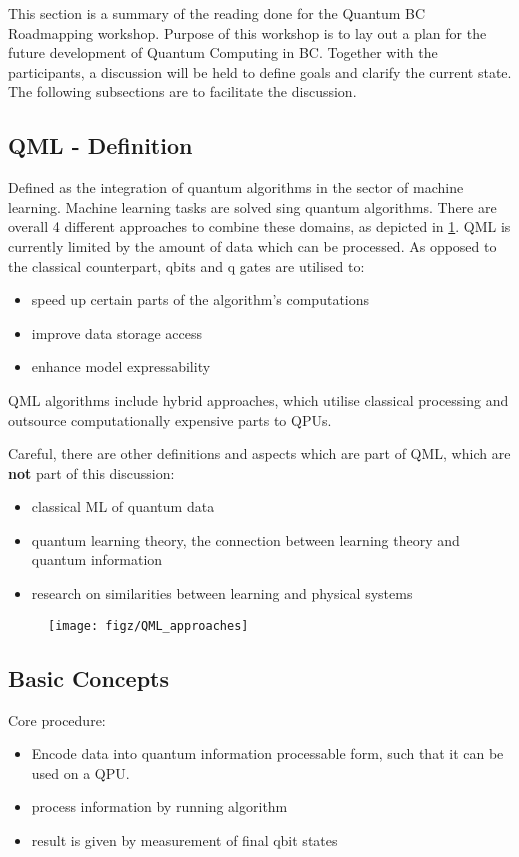 This section is a summary of the reading done for the Quantum BC Roadmapping
workshop. Purpose of this workshop is to lay out a plan for the future
development of Quantum Computing in BC. Together with the participants, a
discussion will be held to define goals and clarify the current state. The
following subsections are to facilitate the discussion.

\subsection{QML - Definition}
Defined as the integration of quantum algorithms in the sector of machine
learning. Machine learning tasks are solved sing quantum algorithms. There are
overall 4 different approaches to combine these domains, as depicted in
\ref{fig:algvsdata}. QML is currently limited by the amount of data which can be
processed. As opposed to the classical counterpart, qbits and q gates are
utilised to:
\begin{itemize}
    \item speed up certain parts of the algorithm's computations
    \item improve data storage access
    \item enhance model expressability
\end{itemize}
QML algorithms include hybrid approaches, which utilise classical processing and
outsource computationally expensive parts to QPUs. 

Careful, there are other definitions and aspects which are part of QML, which
are \textbf{not} part of this discussion:
\begin{itemize}
    \item classical ML of quantum data
    \item quantum learning theory, the connection between learning theory and
    quantum information
    \item research on similarities between learning and physical systems
\end{itemize}

\begin{figure}[ht!]
     \centering
    \texttt{[image: figz/QML\_approaches]}
     \caption{}
  \label{fig:algvsdata} \end{figure}
\clearpage

\subsection{Basic Concepts}
Core procedure:
\begin{itemize}
    \item Encode data into quantum information processable form, such that it
    can be used on a QPU. 
    \item process information  by running algorithm
    \item result is given by measurement of final qbit states
\end{itemize}

